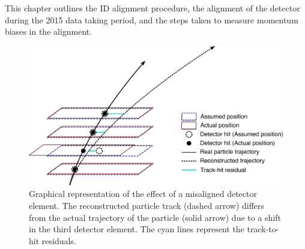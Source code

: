 This chapter outlines the ID alignment procedure, the alignment of the detector during the 2015 data taking period, and the steps taken to measure momentum biases in the alignment.  

\begin{figure}[htbp]
  \centering
  \includegraphics[width=.8\textwidth]{figs/alignment/misalignment}
  \caption{Graphical representation of the effect of a misaligned detector element.  The reconstructed particle track (dashed arrow) differs from the actual trajectory of the particle (solid arrow) due to a shift in the third detector element.  The cyan lines represent the track-to-hit residuals.}
  \label{fig:alignment_effects_misalign}
\end{figure}


%

